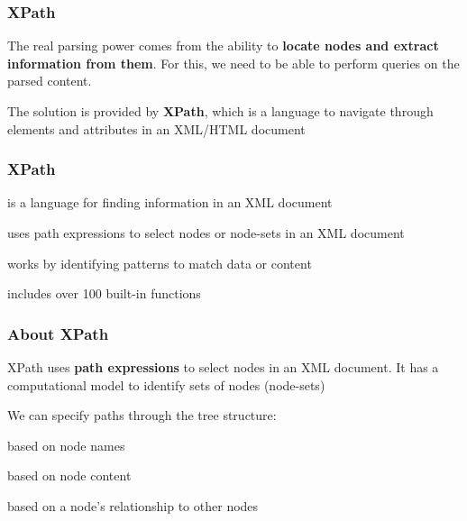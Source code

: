 \documentclass[12pt]{beamer}\usepackage[]{graphicx}\usepackage[]{color}
\begin{document}

\begin{frame}
\begin{center}
\Huge{}
\end{center}
\end{frame}


\begin{frame}[fragile]
\frametitle{XPath}

The real parsing power comes from the ability to \textbf{locate nodes and extract information from them}. For this, we need to be able to perform queries on the parsed content.
\eb

The solution is provided by \textbf{XPath}, which is a language to navigate through elements and attributes in an XML/HTML document
\eb

\end{frame}


\begin{frame}
\frametitle{XPath}

\bi
 \item is a language for finding information in an XML document
 \item uses path expressions to select nodes or node-sets in an XML document
 \item works by identifying patterns to match data or content
 \item includes over 100 built-in functions
\ei
\eb

\end{frame}


\begin{frame}
\frametitle{About XPath}

XPath uses \textbf{path expressions} to select nodes in an XML document. It has a computational model to identify sets of nodes (node-sets)
\eb

We can specify paths through the tree structure:
\bi
 \item based on node names
 \item based on node content
 \item based on a node's relationship to other nodes
\ei
\eb

\end{frame}
\end{document}
